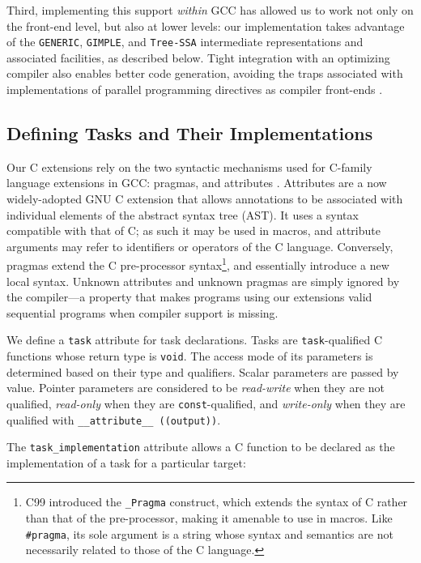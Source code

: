 \documentclass[twoside, a4paper, 10pt]{article}
\begin{document}
Third, implementing this support \emph{within} GCC has allowed us to
work not only on the front-end level, but also at lower levels: our
implementation takes advantage of the \texttt{GENERIC}, \texttt{GIMPLE}, and
\texttt{Tree-SSA} intermediate representations and associated facilities, as
described below.  Tight integration with an optimizing compiler also
enables better code generation, avoiding the traps associated with
implementations of parallel programming directives as compiler
front-ends \cite{pop:inria-00551518}.
\subsection{Defining Tasks and Their Implementations}
\label{sec-3-2}


Our C extensions rely on the two syntactic mechanisms used for C-family
language extensions in GCC: pragmas, and attributes
\cite{stallman13:gcc-manual}.  Attributes are a now widely-adopted GNU C
extension that allows annotations to be associated with individual
elements of the abstract syntax tree (AST).  It uses a syntax compatible
with that of C; as such it may be used in macros, and attribute
arguments may refer to identifiers or operators of the C language.
Conversely, pragmas extend the C pre-processor syntax\footnote{C99 introduced the \texttt{\_Pragma} construct, which extends the syntax
  of C rather than that of the pre-processor, making it amenable to use
  in macros.  Like \texttt{\#pragma}, its sole argument is a string whose syntax
  and semantics are not necessarily related to those of the C language.
 }, and
essentially introduce a new local syntax.  Unknown attributes and
unknown pragmas are simply ignored by the compiler---a property that
makes programs using our extensions valid sequential programs when
compiler support is missing.

We define a \texttt{task} attribute for task declarations.  Tasks are
\texttt{task}-qualified C functions whose return type is \texttt{void}.  The access
mode of its parameters is determined based on their type and qualifiers.
Scalar parameters are passed by value.  Pointer parameters are
considered to be \emph{read-write} when they are not qualified, \emph{read-only}
when they are \texttt{const}-qualified, and \emph{write-only} when they are
qualified with \texttt{\_\_attribute\_\_ ((output))}.

The \texttt{task\_implementation} attribute allows a C function to be
declared as the implementation of a task for a particular target:
\end{document}
